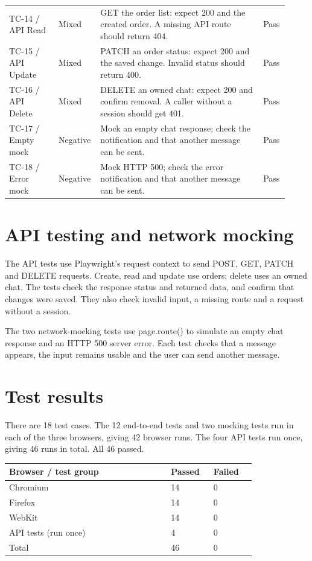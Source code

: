 \documentclass[10pt,a4paper]{article}
\begin{document}
\begin{longtable}{p{0.17\linewidth}p{0.11\linewidth}p{0.57\linewidth}p{0.07\linewidth}}
TC-14 / API Read & Mixed & GET the order list: expect 200 and the created order. A missing API route should return 404. & Pass \\
TC-15 / API Update & Mixed & PATCH an order status: expect 200 and the saved change. Invalid status should return 400. & Pass \\
TC-16 / API Delete & Mixed & DELETE an owned chat: expect 200 and confirm removal. A caller without a session should get 401. & Pass \\
TC-17 / Empty mock & Negative & Mock an empty chat response; check the notification and that another message can be sent. & Pass \\
TC-18 / Error mock & Negative & Mock HTTP 500; check the error notification and that another message can be sent. & Pass \\
\bottomrule\end{longtable}
\normalsize

\section{API testing and network mocking}

The API tests use Playwright's request context to send POST, GET, PATCH and DELETE requests. Create, read and update use orders; delete uses an owned chat. The tests check the response status and returned data, and confirm that changes were saved. They also check invalid input, a missing route and a request without a session.

The two network-mocking tests use page.route() to simulate an empty chat response and an HTTP 500 server error. Each test checks that a message appears, the input remains usable and the user can send another message.

\section{Test results}

There are 18 test cases. The 12 end-to-end tests and two mocking tests run in each of the three browsers, giving 42 browser runs. The four API tests run once, giving 46 runs in total. All 46 passed.

\small
\begin{longtable}{p{0.58\linewidth}p{0.15\linewidth}p{0.15\linewidth}}
\toprule
\textbf{Browser / test group} & \textbf{Passed} & \textbf{Failed} \\ \midrule \endhead
Chromium & 14 & 0 \\
Firefox & 14 & 0 \\
WebKit & 14 & 0 \\
API tests (run once) & 4 & 0 \\
Total & 46 & 0 \\
\bottomrule\end{longtable}
\normalsize
\end{document}
